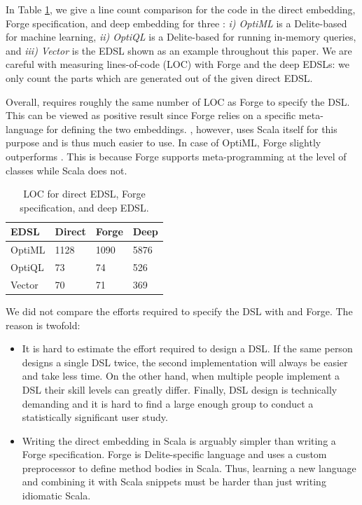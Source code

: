 In Table \ref{tbl:deepgen}, we give a line count comparison for the code in
the direct embedding, Forge specification, and deep embedding for three \edsls:
\emph{i) OptiML} is a Delite-based \edsl for machine learning,
\emph{ii) OptiQL} is a Delite-based \edsl for running in-memory queries, and
\emph{iii) Vector} is the EDSL shown as an example throughout this paper.
We are careful with measuring lines-of-code (LOC) with Forge and the deep EDSLs: we only
count the parts which are generated out of the given direct EDSL.

Overall, \yy requires roughly the same number of LOC as Forge to specify the DSL.
This can be viewed as positive result since Forge relies on a specific meta-language
 for defining the two embeddings. \yy, however, uses Scala itself
for this purpose and is thus much easier to use. In case of OptiML, Forge
slightly outperforms \yy. This is because Forge supports meta-programming at
the level of classes while Scala does not.

\begin{table}[ht]
\caption{LOC for direct EDSL, Forge specification, and deep EDSL.}
\label{tbl:deepgen}
\centering
\begin{tabularx}{\linewidth}{ X X X X }
\toprule
 EDSL       &   Direct      &     Forge     &   Deep      \\ \midrule
OptiML      &   1128        &     1090    &   5876      \\
OptiQL      &   73          &     74      &   526       \\
Vector      &   70          &     71      &   369       \\
\bottomrule
\end{tabularx}
\end{table}

We did not compare the efforts required to specify the DSL with \yy and Forge. The
reason is twofold:
\begin{itemize}

\item It is hard to estimate the effort required to design a DSL. If the same
person designs a single DSL twice, the second implementation will always be
easier and take less time. On the other hand, when multiple people implement a DSL their skill levels
can greatly differ. Finally, DSL design is technically demanding and it is hard to find
a large enough group to conduct a statistically significant user
study.

\item Writing the direct embedding in Scala is arguably simpler than writing a
Forge specification. Forge is Delite-specific language and uses a custom
preprocessor to define method bodies in Scala. Thus, learning a new language and
combining it with Scala snippets must be harder than just writing idiomatic
Scala.
\end{itemize}

